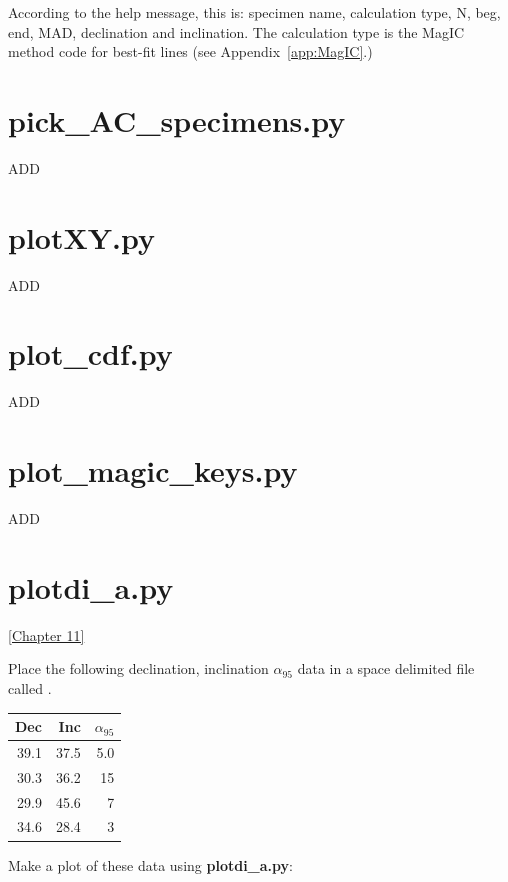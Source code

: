 \documentclass[11pt]{book}
\begin{document}
{{ According to the help message, this is: specimen name, calculation type, N, beg, end, MAD, declination and inclination.   The calculation type is the MagIC method code for best-fit lines (see Appendix~\ref{app:MagIC}.)
 

  
  \section{pick\_AC\_specimens.py}
  
  ADD
  
  \section{plotXY.py}
  
  ADD
  
  \section{plot\_cdf.py}
  
  ADD
  
  \section{plot\_magic\_keys.py}
  
  ADD
\section {\bf plotdi\_a.py} 
\href{http://Webbook2.html/#Fisher_statistics}{[Chapter 11]}

Place the following declination, inclination $\alpha_{95}$ data in a space delimited file called . 

\begin{tabular}{rrr}
\hline
Dec&Inc&$\alpha_{95}$\\
\hline
39.1 & 37.5 & 5.0\\
30.3 & 36.2 & 15\\
29.9 & 45.6 & 7\\
34.6 & 28.4 & 3\\
\hline
\end{tabular}

Make a plot of these data using {\bf plotdi\_a.py}:

}}
\end{document}
